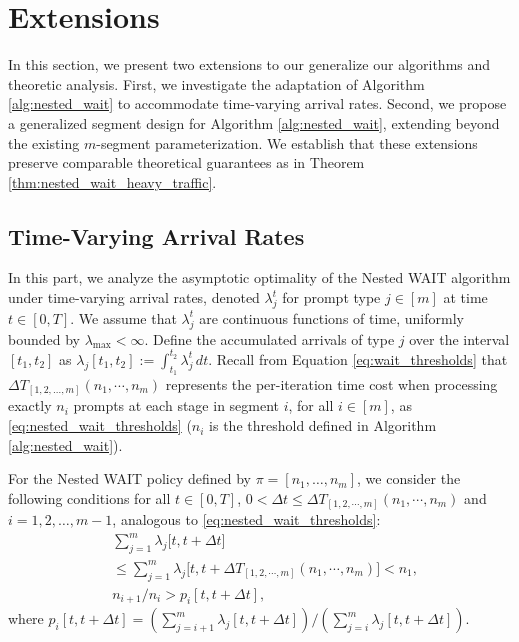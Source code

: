 \section{Extensions}\label{sec:extension}

In this section, we present two extensions to our generalize our algorithms and theoretic analysis. First, we investigate the adaptation of Algorithm \ref{alg:nested_wait} to accommodate time-varying arrival rates. Second, we propose a generalized segment design for Algorithm \ref{alg:nested_wait}, extending beyond the existing $m$-segment parameterization. We establish that these extensions preserve comparable theoretical guarantees as in Theorem \ref{thm:nested_wait_heavy_traffic}.

\subsection{Time-Varying Arrival Rates}\label{sec:time_varying}

In this part, we analyze the asymptotic optimality of the Nested WAIT algorithm under time-varying arrival rates, denoted $\lambda_j^t$ for prompt type $j \in [m]$ at time $t \in [0, T]$. We assume that $\lambda_j^t$ are continuous functions of time, uniformly bounded by $\lambda_{\max} < \infty$. Define the accumulated arrivals of type $j$ over the interval $[t_1, t_2]$ as $\lambda_j[t_1, t_2] := \int_{t_1}^{t_2} \lambda_j^t \, dt$. Recall from Equation \eqref{eq:wait_thresholds} that $\Delta T_{[1,2,\dots,m]}(n_1,\cdots,n_m)$ represents the per-iteration time cost when processing exactly $n_i$ prompts at each stage in segment $i$, for all $i \in [m]$, as \eqref{eq:nested_wait_thresholds} ($n_i$ is the threshold defined in Algorithm \ref{alg:nested_wait}).

For the Nested WAIT policy defined by $\pi = [n_1, \dots, n_m]$, we consider the following conditions for all $t\in [0, T]$, $0<\Delta t\leq \Delta T_{[1,2,\cdots,m]}(n_1,\cdots,n_m)$ and $i = 1, 2, \dots, m-1$, analogous to \eqref{eq:nested_wait_thresholds}:
\begin{equation}
    \label{eq:nested_wait_thresholds_time_varying}
\begin{aligned}
        & \sum_{j=1}^m \lambda_j\big[t, t + \Delta t\big] \\&\leq \sum_{j=1}^m \lambda_j\big[t, t +\Delta T_{[1,2,\cdots,m]}(n_1,\cdots,n_m)\big]< n_1, \\
        & n_{i+1}/n_i > p_i[t,t+\Delta t],
\end{aligned}
\end{equation}
where $p_i[t,t+\Delta t] = (\sum_{j=i+1}^m\lambda_j[t,t+\Delta t])/(\sum_{j=i}^m\lambda_j[t,t+\Delta t]).$

